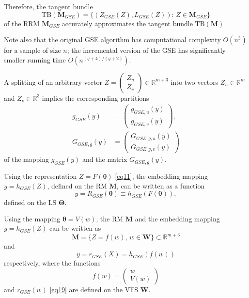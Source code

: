 \documentclass[conference]{IEEEtran} %
\def\mbW{\mathbf{W}}
\def\mbTheta{{\bm\Theta}}
\def\mbtheta{{\bm\theta}}
\def\mbM{\mathbf{M}}
\def\RR{\mathbb{R}}
\begin{document}
Therefore, the tangent bundle 
\[
	\mathrm{TB}(\mbM_{GSE}) = \{(Z_{GSE}(Z), L_{GSE}(Z)):\, Z \in\mbM_{GSE}\}
\]
of the RRM $\mbM_{GSE}$ accurately approximates the tangent bundle $\mathrm{TB}(\mbM)$.

Note also that the original GSE algorithm \cite{bib21,bib22} has computational complexity $O(n^3)$ for a sample of size $n$; the incremental version of the GSE \cite{bib27} has significantly smaller running time $O(n^{(q+4)/(q+2)})$.

A splitting of an arbitrary vector 
$Z = \left(
\begin{array}{c}
Z_u\\
Z_v
\end{array}
\right)\in\RR^{m+3}$ into two vectors $Z_u\in\RR^m$ and $Z_v\in\RR^3$ implies the corresponding partitions 
\begin{align}
	g_{GSE}(y) &= 
\left(\begin{array}{c}
g_{GSE,u}(y)\\
g_{GSE,v}(y)
\end{array}
\right), \label{eq17}
\\
	G_{GSE,g}(y) &= 
\left(\begin{array}{c}
G_{GSE,g,u}(y)\\
G_{GSE,g,v}(y)
\end{array}
\right) \label{eq1711}
\end{align}    
of the mapping $g_{GSE}(y)$ and the matrix $G_{GSE,g}(y)$. 

Using the representation $Z = F(\mbtheta)$ \eqref{eq11}, the embedding mapping $y = h_{GSE}(Z)$, defined on the RM $\mbM$, can be written as a function
\begin{equation}
\label{eq18}
	y = R_{GSE}(\mbtheta) \equiv h_{GSE}(F(\mbtheta)),
\end{equation}    
defined on the LS $\mbTheta$.

Using the mapping $\mbtheta = V(w)$, the RM $\mbM$ and the embedding mapping $y = h_{GSE}(Z)$ can be written as 
\[
	\mbM = \{Z=f(w),\,w\in\mathbf{W}\}\subset\RR^{m+3}
\]
and
\begin{equation}
\label{eq19}
	y = r_{GSE}(X) = h_{GSE}(f(w))
\end{equation}    
respectively, where the functions
\[
	f(w) = \left(\begin{array}{c}
w\\
V(w)
\end{array}
\right)
\]
and $r_{GSE}(w)$ \eqref{eq19} are defined on the VFS $\mbW$.
\end{document}
